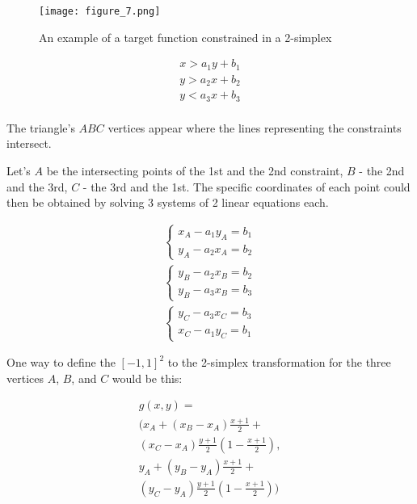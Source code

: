 \documentclass[
	a4paper, %
	10pt, %
	unnumberedsections, %
	twoside, %
]{LTJournalArticle}
\begin{document}
\begin{figure} 
	\texttt{[image: figure\_7.png]}
	\caption{An example of a target function constrained in a 2-simplex}
	\label{fig:triangle_ABC}
\end{figure}

\begin{equation}
	\begin{array}{cc}
x > a_1y + b_1 \\
y > a_2x + b_2 \\
y < a_3x + b_3 \\
	\end{array}
	\label{eq:three_constaints}
\end{equation}

The triangle's $ABC$ vertices appear where the lines representing the constraints intersect.

Let's $A$ be the intersecting points of the 1st and the 2nd constraint, $B$ - the 2nd and the 3rd, $C$ - the 3rd and the 1st. The specific coordinates of each point could then be obtained by solving 3 systems of 2 linear equations each.

\begin{equation}
	\begin{aligned} 
		\left\{ \begin{aligned} 
x_A - a_1y_A = b_1 \\
y_A - a_2x_A = b_2
		\end{aligned} \right. \\
		\left\{ \begin{aligned} 
y_B - a_2x_B = b_2 \\
y_B - a_3x_B = b_3
		\end{aligned} \right. \\	
		\left\{ \begin{aligned} 
y_C - a_3x_C = b_3 \\
x_C - a_1y_C = b_1
		\end{aligned} \right.
	\end{aligned}	
	\label{eq:ABC_systems}
\end{equation}

One way to define the $[-1, 1]^2$ to the 2-simplex transformation for the three vertices $A$, $B$, and $C$ would be this:

\begin{equation}
	\begin{split}
g(x, y) = \\
(x_A + (x_B-x_A)\frac{x+1}{2} + \\
(x_C-x_A)\frac{y+1}{2}(1-\frac{x+1}{2}),\\
y_A + (y_B-y_A)\frac{x+1}{2} + \\
(y_C-y_A)\frac{y+1}{2}(1-\frac{x+1}{2}))
	\end{split}
	\label{eq:ABC_transformation}
\end{equation}
\end{document}
